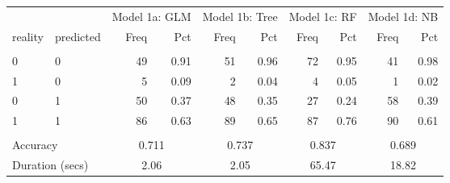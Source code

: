 \begin{tabular}{llrrrrrrrr}
   \toprule 
 & & 
                        \multicolumn{2}{l}{Model 1a: GLM} & 
                        \multicolumn{2}{l}{Model 1b: Tree} & 
                        \multicolumn{2}{l}{Model 1c: RF} &
                        \multicolumn{2}{l}{Model 1d: NB} 
                        \\ 
 \cmidrule(lr){3-4} 
                        \cmidrule(lr){5-6} 
                        \cmidrule(lr){7-8} 
                        \cmidrule(lr){9-10} 
                        
  reality & predicted & 
                        Freq & Pct & 
                        Freq & Pct & 
                        Freq & Pct & 
                        Freq & Pct 
                        \\ \hline \\[-1.8ex]  
 0 & 0 &  49 & 0.91 &  51 & 0.96 &  72 & 0.95 &  41 & 0.98 \\ 
  1 & 0 &   5 & 0.09 &   2 & 0.04 &   4 & 0.05 &   1 & 0.02 \\ 
  0 & 1 &  50 & 0.37 &  48 & 0.35 &  27 & 0.24 &  58 & 0.39 \\ 
  1 & 1 &  86 & 0.63 &  89 & 0.65 &  87 & 0.76 &  90 & 0.61 \\ 
   \hline \\[-1.8ex]  

              \multicolumn{2}{l}{Accuracy} & 
                   \multicolumn{2}{c}{0.711} & 
                   \multicolumn{2}{c}{0.737} & 
                   \multicolumn{2}{c}{0.837} & 
                   \multicolumn{2}{c}{0.689} 
                   \\ 
 
                   \multicolumn{2}{l}{Duration (secs)} & 
                   \multicolumn{2}{c}{2.06} &
                   \multicolumn{2}{c}{2.05} &
                   \multicolumn{2}{c}{65.47} &
                   \multicolumn{2}{c}{18.82}
                   \\ 
 \bottomrule 
\end{tabular}

